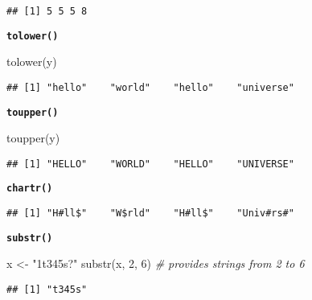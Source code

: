 \documentclass[
]{book}
\newenvironment{Shaded}{\begin{snugshade}}{\end{snugshade}}
\newcommand{\CommentTok}[1]{\textcolor[rgb]{0.56,0.35,0.01}{\textit{#1}}}
\newcommand{\DecValTok}[1]{\textcolor[rgb]{0.00,0.00,0.81}{#1}}
\newcommand{\FunctionTok}[1]{\textcolor[rgb]{0.00,0.00,0.00}{#1}}
\newcommand{\NormalTok}[1]{#1}
\newcommand{\OtherTok}[1]{\textcolor[rgb]{0.56,0.35,0.01}{#1}}
\newcommand{\StringTok}[1]{\textcolor[rgb]{0.31,0.60,0.02}{#1}}
\begin{document}
\begin{verbatim}
## [1] 5 5 5 8
\end{verbatim}

{\textbf{\texttt{tolower()}
}}

\begin{Shaded}
\begin{Highlighting}[]
\FunctionTok{tolower}\NormalTok{(y)}
\end{Highlighting}
\end{Shaded}

\begin{verbatim}
## [1] "hello"    "world"    "hello"    "universe"
\end{verbatim}

{\textbf{\texttt{toupper()}
}}

\begin{Shaded}
\begin{Highlighting}[]
\FunctionTok{toupper}\NormalTok{(y)}
\end{Highlighting}
\end{Shaded}

\begin{verbatim}
## [1] "HELLO"    "WORLD"    "HELLO"    "UNIVERSE"
\end{verbatim}

{\textbf{\texttt{chartr()}
}}

\begin{Shaded}
\end{Shaded}

\begin{verbatim}
## [1] "H#ll$"    "W$rld"    "H#ll$"    "Univ#rs#"
\end{verbatim}

{\textbf{\texttt{substr()}
}}

\begin{Shaded}
\begin{Highlighting}[]
\NormalTok{x }\OtherTok{\textless{}{-}} \StringTok{"1t345s?"}
\FunctionTok{substr}\NormalTok{(x, }\DecValTok{2}\NormalTok{, }\DecValTok{6}\NormalTok{) }\CommentTok{\# provides strings from 2 to 6}
\end{Highlighting}
\end{Shaded}

\begin{verbatim}
## [1] "t345s"
\end{verbatim}
\end{document}
